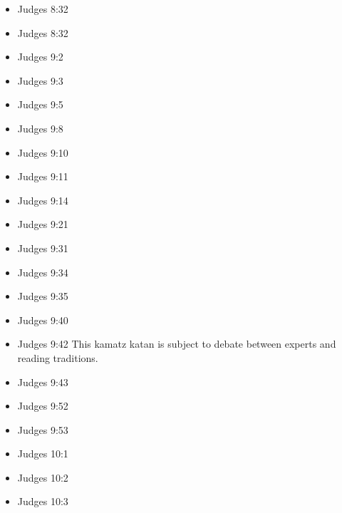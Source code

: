 \documentclass[14pt]{book}
\begin{document}
\begin{multicols}{2}
\begin{itemize}
			\item Judges 8:32
			
			\item Judges 8:32
			
			\item Judges 9:2
			
			\item Judges 9:3
			
			\item Judges 9:5
			
			\item Judges 9:8
			
			\item Judges 9:10
			
			\item Judges 9:11
			
			\item Judges 9:14
			
			\item Judges 9:21
			
			\item Judges 9:31
			
			\item Judges 9:34
			
			\item Judges 9:35
			
			\item Judges 9:40
			
			\item Judges 9:42 This kamatz katan is subject to debate between experts and reading traditions.
			
			\item Judges 9:43
			
			\item Judges 9:52
			
			\item Judges 9:53
			
			\item Judges 10:1
			
			\item Judges 10:2
			
			\item Judges 10:3
			

\end{itemize}
\end{multicols}
\end{document}
